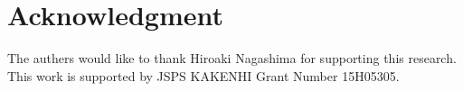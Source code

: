 \documentclass[conference]{IEEEtran/IEEEtran}
\begin{document}


\section*{Acknowledgment}

The authers would like to thank Hiroaki Nagashima for supporting this research.
This work is supported by JSPS KAKENHI Grant Number 15H05305.





\end{document}
